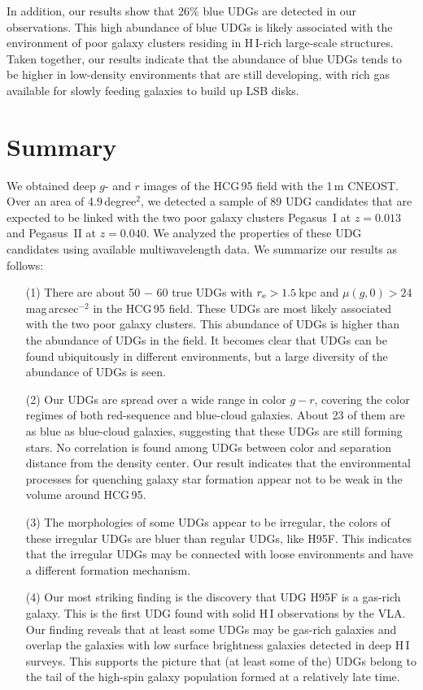 \documentclass[twocolumn,trackchanges]{aastex61}
\begin{document}
In addition, our results show that 26\% blue UDGs are detected in our observations. This high abundance of blue UDGs is likely associated with the environment of poor galaxy clusters residing in H\,{\small I}-rich large-scale structures. Taken together, our results indicate that the abundance of blue UDGs tends to be higher in low-density environments that are still developing, with rich gas available for slowly feeding galaxies to build up LSB disks.



\section{Summary} \label{sec:summary}

We obtained deep $g$- and $r$ images of the HCG\,95 field  with the 1\,m CNEOST.  Over an area of 4.9\,degree$^2$, we detected a sample of 89 UDG candidates that are expected to be linked with the two poor galaxy clusters Pegasus~I at $z=0.013$ and Pegasus~II at $z=0.040$. We analyzed the properties of these UDG candidates using available multiwavelength data.  We summarize our results as follows:

\begin{itemize}
\item[(1)] There are about 50 $-$ 60 true UDGs with $r_{\rm e} > 1.5$\,kpc and $\mu(g,0)>24$\,mag\,arcsec$^{-2}$ in the HCG\,95 field. These UDGs are most likely associated with the two poor galaxy clusters. This abundance of UDGs is higher than the abundance of UDGs in the field. It becomes clear that UDGs can be found ubiquitously in different environments, but a large diversity of the abundance of UDGs is seen. 

\item[(2)] 
Our UDGs are spread over a wide range in color $g-r$, covering the color regimes of both red-sequence and blue-cloud galaxies. About 23 of them are as blue as blue-cloud galaxies, suggesting that these UDGs are still forming stars. No correlation is found among UDGs between color and separation distance from the density center. Our result indicates that the environmental processes for quenching galaxy star formation appear not to be weak in the volume around HCG\,95. 
 

\item[(3)] 
The morphologies of some UDGs appear to be irregular, the colors of these irregular UDGs are bluer than regular UDGs, like H95F. This indicates that the irregular UDGs may be connected with loose environments and have a different formation mechanism.

\item[(4)] 
Our most striking finding is the discovery that UDG H95F is a gas-rich galaxy. This is the first UDG found with solid H\,{\small I} observations by the VLA. Our finding reveals that at least some UDGs may be gas-rich galaxies and overlap the galaxies with low surface brightness galaxies detected in deep H\,{\small I} surveys. 
This supports the picture that (at least some of the) UDGs belong to the tail of the high-spin galaxy population formed at a relatively late time. 

\end{itemize}
\end{document}
